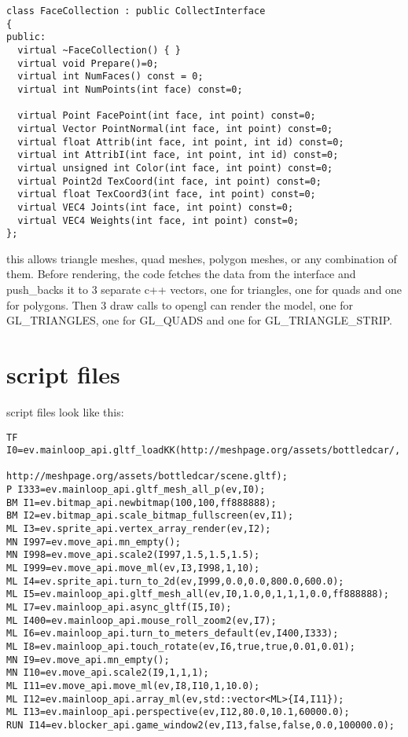 \documentclass[11pt,twoside,a4paper]{article}
\begin{document}
\begin{verbatim}
class FaceCollection : public CollectInterface
{
public:
  virtual ~FaceCollection() { }
  virtual void Prepare()=0;
  virtual int NumFaces() const = 0;
  virtual int NumPoints(int face) const=0;
  
  virtual Point FacePoint(int face, int point) const=0;
  virtual Vector PointNormal(int face, int point) const=0;
  virtual float Attrib(int face, int point, int id) const=0;
  virtual int AttribI(int face, int point, int id) const=0;
  virtual unsigned int Color(int face, int point) const=0;
  virtual Point2d TexCoord(int face, int point) const=0;
  virtual float TexCoord3(int face, int point) const=0;
  virtual VEC4 Joints(int face, int point) const=0;
  virtual VEC4 Weights(int face, int point) const=0;
};
\end{verbatim}

this allows triangle meshes, quad meshes, polygon meshes, or any
combination of them. Before rendering, the code fetches the data from
the interface and push\_backs it to 3 separate c++ vectors, one for triangles, one for quads and one for polygons. Then 3 draw calls to opengl can render the model, one for GL\_TRIANGLES, one for GL\_QUADS and one for GL\_TRIANGLE\_STRIP.

\section{script files}

script files look like this:
\begin{verbatim}
TF I0=ev.mainloop_api.gltf_loadKK(http://meshpage.org/assets/bottledcar/,
                        http://meshpage.org/assets/bottledcar/scene.gltf);
P I333=ev.mainloop_api.gltf_mesh_all_p(ev,I0);
BM I1=ev.bitmap_api.newbitmap(100,100,ff888888);
BM I2=ev.bitmap_api.scale_bitmap_fullscreen(ev,I1);
ML I3=ev.sprite_api.vertex_array_render(ev,I2);
MN I997=ev.move_api.mn_empty();
MN I998=ev.move_api.scale2(I997,1.5,1.5,1.5);
ML I999=ev.move_api.move_ml(ev,I3,I998,1,10);
ML I4=ev.sprite_api.turn_to_2d(ev,I999,0.0,0.0,800.0,600.0);
ML I5=ev.mainloop_api.gltf_mesh_all(ev,I0,1.0,0,1,1,1,0.0,ff888888);
ML I7=ev.mainloop_api.async_gltf(I5,I0);
ML I400=ev.mainloop_api.mouse_roll_zoom2(ev,I7);
ML I6=ev.mainloop_api.turn_to_meters_default(ev,I400,I333);
ML I8=ev.mainloop_api.touch_rotate(ev,I6,true,true,0.01,0.01);
MN I9=ev.move_api.mn_empty();
MN I10=ev.move_api.scale2(I9,1,1,1);
ML I11=ev.move_api.move_ml(ev,I8,I10,1,10.0);
ML I12=ev.mainloop_api.array_ml(ev,std::vector<ML>{I4,I11});
ML I13=ev.mainloop_api.perspective(ev,I12,80.0,10.1,60000.0);
RUN I14=ev.blocker_api.game_window2(ev,I13,false,false,0.0,100000.0);
\end{verbatim}
\end{document}
